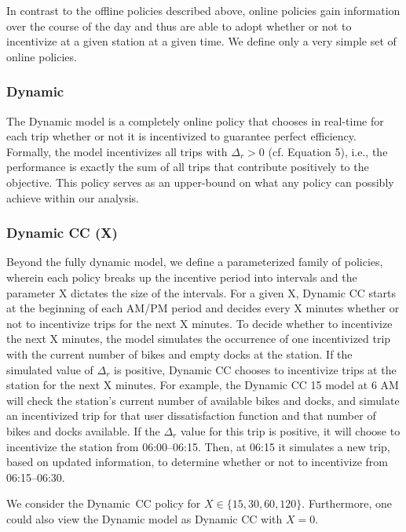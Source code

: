 In contrast to the offline policies described above, online policies gain information over the course of the day and thus are able to adopt whether or not to incentivize at a given station at a given time. We define only a very simple set of online policies.

\subsubsection{Dynamic}
The Dynamic model is a completely online policy that chooses in real-time for each trip whether or not it is incentivized to guarantee perfect efficiency. Formally, the model incentivizes all trips with $\Delta_r>0$ (cf. Equation 5), i.e., the performance is exactly the sum of all trips that contribute positively to the objective. This policy serves as an upper-bound on what any policy can possibly achieve within our analysis. 

\subsubsection{Dynamic CC (X)}
Beyond the fully dynamic model, we define a parameterized family of policies, wherein each policy breaks up the incentive period into intervals and the parameter X dictates the size of the intervals. For a given X, Dynamic CC starts at the beginning of each AM/PM period and decides every X minutes whether or not to incentivize trips for the next X minutes. To decide whether to incentivize the next X minutes, the model simulates the occurrence of one incentivized trip with the current number of bikes and empty docks at the station. If the simulated value of $\Delta_r$ is positive, Dynamic CC chooses to incentivize trips at the station for the next X minutes. For example, the Dynamic CC 15 model at 6 AM will check the station's current number of available bikes and docks, and simulate an incentivized trip for that user dissatisfaction function and that number of bikes and docks available. If the $\Delta_r$ value for this trip is positive, it will choose to incentivize the station from 06:00--06:15. Then, at 06:15 it simulates a new trip, based on updated information, to determine whether or not to incentivize from 06:15--06:30. 

We consider the Dynamic~CC policy for $X\in\{15,30,60,120\}$. Furthermore, one could also view the Dynamic model as Dynamic CC with $X=0$.


